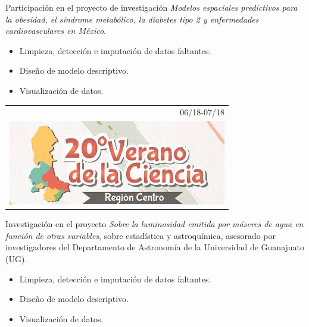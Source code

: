 \documentclass[]{friggeri-cv}
\begin{document}
\begin{entrylist}
    { }
    {Participación en el proyecto de investigación \textsl{Modelos espaciales predictivos para la obesidad, el síndrome metabólico, la diabetes tipo 2 y enfermedades cardiovasculares en México}.
    \begin{itemize}
	\item Limpieza, detección e imputación de datos faltantes.
	\item Diseño de modelo descriptivo.
	\item Visualización de datos.
\end{itemize}}
  \entry
    {\begin{tabular}{r}
    		06/18-07/18\\
     		\includegraphics[scale=0.203]{img/20verano.jpeg}
	\end{tabular}\hspace{0.4cm}
    }
    {\vspace{-0.98cm}}
    { }
    {Investigación en el proyecto \textsl{Sobre la luminosidad emitida por máseres de agua en función de otras variables}, sobre estadística y astroquímica, asesorado por investigadores del Departamento de Astronomía de la Universidad de Guanajuato (UG).
    \begin{itemize}
	\item Limpieza, detección e imputación de datos faltantes.
	\item Diseño de modelo descriptivo.
	\item Visualización de datos.
\end{itemize}}%
\end{entrylist}
\end{document}
